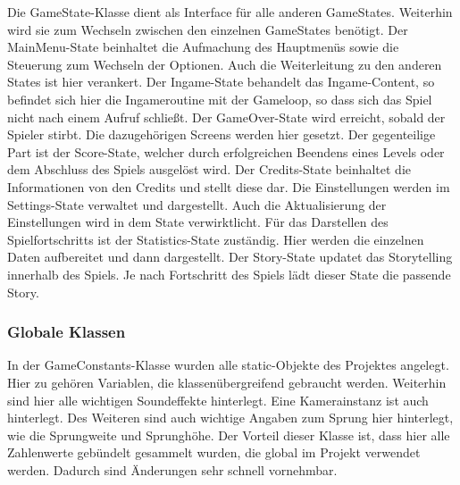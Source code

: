\documentclass[10pt]{article}
\begin{document}
Die GameState-Klasse dient als Interface für alle anderen GameStates. Weiterhin wird sie zum Wechseln zwischen den einzelnen GameStates benötigt.\newline\newline
Der MainMenu-State beinhaltet die Aufmachung des Hauptmenüs sowie die Steuerung zum Wechseln der Optionen. Auch die Weiterleitung zu den
anderen States ist hier verankert.\newline\newline
Der Ingame-State behandelt das Ingame-Content, so befindet sich hier die Ingameroutine mit der Gameloop, so dass sich das Spiel nicht nach einem Aufruf schließt.\newline\newline
Der GameOver-State wird erreicht, sobald der Spieler stirbt. Die dazugehörigen Screens werden hier gesetzt.\newline\newline
Der gegenteilige Part ist der Score-State, welcher durch erfolgreichen Beendens eines Levels oder dem Abschluss des Spiels ausgelöst wird.\newline\newline
Der Credits-State beinhaltet die Informationen von den Credits und stellt diese dar.\newline
Die Einstellungen werden im Settings-State verwaltet und dargestellt.
Auch die Aktualisierung der Einstellungen wird in dem State verwirktlicht.\newline\newline
Für das Darstellen des Spielfortschritts ist der Statistics-State zuständig. Hier werden die einzelnen Daten aufbereitet und dann dargestellt.\newline\newline
Der Story-State updatet das Storytelling innerhalb des Spiels. Je nach Fortschritt des Spiels lädt dieser State die passende Story.

\vspace{1cm}
\subsubsection{Globale Klassen}

In der GameConstants-Klasse wurden alle static-Objekte des Projektes angelegt. Hier zu gehören Variablen, die klassenübergreifend gebraucht werden.
Weiterhin sind hier alle wichtigen Soundeffekte hinterlegt. Eine Kamerainstanz ist auch hinterlegt. Des Weiteren sind auch wichtige Angaben zum Sprung
hier hinterlegt, wie die Sprungweite und Sprunghöhe. Der Vorteil dieser Klasse ist, dass hier alle Zahlenwerte gebündelt gesammelt wurden, die global im
Projekt verwendet werden. Dadurch sind Änderungen sehr schnell vornehmbar.
\end{document}
